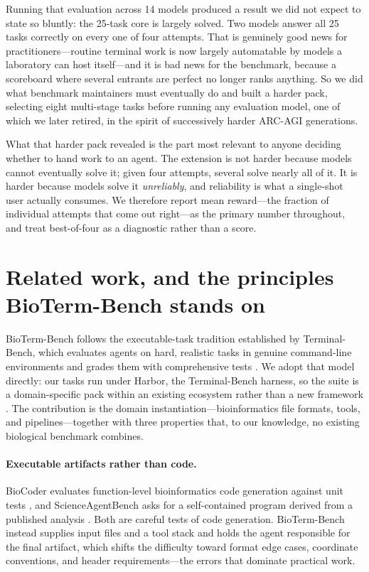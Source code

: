 \documentclass[11pt]{article}
\begin{document}
Running that evaluation across 14 models produced a result we did not expect to state so bluntly: the 25-task core is largely solved.
Two models answer all 25 tasks correctly on every one of four attempts.
That is genuinely good news for practitioners---routine terminal work is now largely automatable by models a laboratory can host itself---and it is bad news for the benchmark, because a scoreboard where several entrants are perfect no longer ranks anything.
So we did what benchmark maintainers must eventually do and built a harder pack, selecting eight multi-stage tasks before running any evaluation model, one of which we later retired, in the spirit of successively harder ARC-AGI generations.

What that harder pack revealed is the part most relevant to anyone deciding whether to hand work to an agent.
The extension is not harder because models cannot eventually solve it; given four attempts, several solve nearly all of it.
It is harder because models solve it \emph{unreliably}, and reliability is what a single-shot user actually consumes.
We therefore report mean reward---the fraction of individual attempts that come out right---as the primary number throughout, and treat best-of-four as a diagnostic rather than a score.

\section{Related work, and the principles BioTerm-Bench stands on}

BioTerm-Bench follows the executable-task tradition established by Terminal-Bench, which evaluates agents on hard, realistic tasks in genuine command-line environments and grades them with comprehensive tests \citep{merrill2026terminalbench}.
We adopt that model directly: our tasks run under Harbor, the Terminal-Bench harness, so the suite is a domain-specific pack within an existing ecosystem rather than a new framework \citep{harbor2026}.
The contribution is the domain instantiation---bioinformatics file formats, tools, and pipelines---together with three properties that, to our knowledge, no existing biological benchmark combines.

\paragraph{Executable artifacts rather than code.}
BioCoder evaluates function-level bioinformatics code generation against unit tests \citep{tang2024biocoder}, and ScienceAgentBench asks for a self-contained program derived from a published analysis \citep{chen2025scienceagentbench}.
Both are careful tests of code generation.
BioTerm-Bench instead supplies input files and a tool stack and holds the agent responsible for the final artifact, which shifts the difficulty toward format edge cases, coordinate conventions, and header requirements---the errors that dominate practical work.
\end{document}
